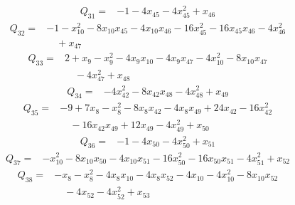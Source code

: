 \begin{equation*}\begin{split}
Q_{31}={}&-1 - 4x_{45} - 4x_{45}^{2} + x_{46}
\end{split}\end{equation*}
\begin{equation*}\begin{split}
Q_{32}={}&-1 - x_{10}^{2} - 8x_{10} x_{45} - 4x_{10} x_{46} - 16x_{45}^{2} - 16x_{45} x_{46} - 4x_{46}^{2}\\
&\quad + x_{47}
\end{split}\end{equation*}
\begin{equation*}\begin{split}
Q_{33}={}&2 + x_{9} - x_{9}^{2} - 4x_{9} x_{10} - 4x_{9} x_{47} - 4x_{10}^{2} - 8x_{10} x_{47}\\
&\quad -4x_{47}^{2} + x_{48}
\end{split}\end{equation*}
\begin{equation*}\begin{split}
Q_{34}={}&-4x_{42}^{2} - 8x_{42} x_{48} - 4x_{48}^{2} + x_{49}
\end{split}\end{equation*}
\begin{equation*}\begin{split}
Q_{35}={}&-9 + 7x_{8} - x_{8}^{2} - 8x_{8} x_{42} - 4x_{8} x_{49} + 24x_{42} - 16x_{42}^{2}\\
&\quad -16x_{42} x_{49} + 12x_{49} - 4x_{49}^{2} + x_{50}
\end{split}\end{equation*}
\begin{equation*}\begin{split}
Q_{36}={}&-1 - 4x_{50} - 4x_{50}^{2} + x_{51}
\end{split}\end{equation*}
\begin{equation*}\begin{split}
Q_{37}={}&-x_{10}^{2} - 8x_{10} x_{50} - 4x_{10} x_{51} - 16x_{50}^{2} - 16x_{50} x_{51} - 4x_{51}^{2} + x_{52}
\end{split}\end{equation*}
\begin{equation*}\begin{split}
Q_{38}={}&-x_{8} - x_{8}^{2} - 4x_{8} x_{10} - 4x_{8} x_{52} - 4x_{10} - 4x_{10}^{2} - 8x_{10} x_{52}\\
&\quad -4x_{52} - 4x_{52}^{2} + x_{53}
\end{split}\end{equation*}
